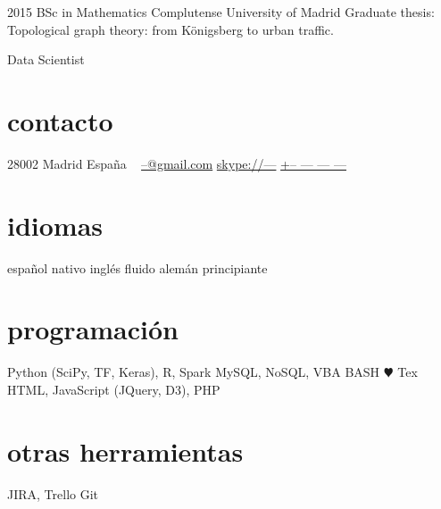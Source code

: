 \documentclass[]{friggeri-cv}
\begin{document}
\begin{entrylist}
  \entry
    {2015}
    {BSc in Mathematics}
    {Complutense University of Madrid}
    {Graduate thesis: Topological graph theory: from Königsberg to urban traffic.}
\end{entrylist}




\else

       {Data Scientist}


\begin{aside}
  \section{contacto}
    28002 Madrid
    España
    ~
    \href{mailto:--@gmail.com}{--@gmail.com}
    \href{skype:<--->[add]}{skype://---}
    \href{tel:-------------}{+-- --- --- ---}
  \section{idiomas}
    español nativo
    inglés fluido
    alemán principiante
  \section{programación}
    Python (SciPy, TF, Keras), R, Spark
    MySQL, NoSQL, VBA
    BASH
    {\color{red} $\varheartsuit$} Tex
    HTML, JavaScript (JQuery, D3), PHP
  \section{otras herramientas}
    JIRA, Trello
    Git
\end{aside}
\end{document}
